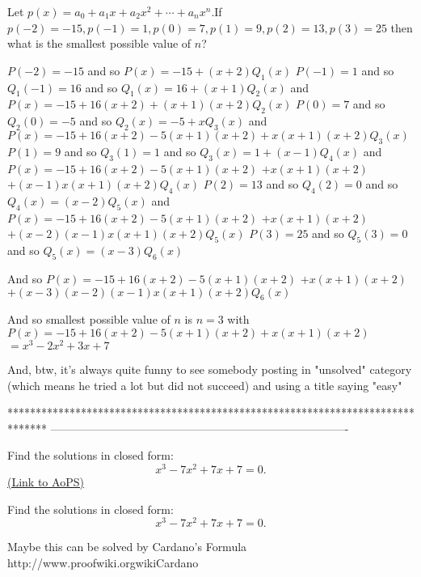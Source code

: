 \begin{solution}
	\begin{tcolorbox}Let $p(x)=a_0+a_1x+a_2x^2+ \cdots +a_nx^n$.If $p(-2)=-15,p(-1)=1,p(0)=7,p(1)=9,p(2)=13,p(3)=25$ then what is the smallest possible value of $n$?\end{tcolorbox}
$P(-2)=-15$ and so $P(x)=-15+(x+2)Q_1(x)$
$P(-1)=1$ and so $Q_1(-1)=16$ and so $Q_1(x)=16+(x+1)Q_2(x)$ and $P(x)=-15+16(x+2)+(x+1)(x+2)Q_2(x)$
$P(0)=7$ and so $Q_2(0)=-5$ and so $Q_2(x)=-5+xQ_3(x)$ and $P(x)=-15+16(x+2)-5(x+1)(x+2)+x(x+1)(x+2)Q_3(x)$
$P(1)=9$ and so $Q_3(1)=1$ and so $Q_3(x)=1+(x-1)Q_4(x)$ and $P(x)=-15+16(x+2)-5(x+1)(x+2)$ $+x(x+1)(x+2)$ $+(x-1)x(x+1)(x+2)Q_4(x)$
$P(2)=13$ and so $Q_4(2)=0$ and so $Q_4(x)=(x-2)Q_5(x)$ and $P(x)=-15+16(x+2)-5(x+1)(x+2)$ $+x(x+1)(x+2)$ $+(x-2)(x-1)x(x+1)(x+2)Q_5(x)$
$P(3)=25$ and so $Q_5(3)=0$ and so $Q_5(x)=(x-3)Q_6(x)$

And so $P(x)=-15+16(x+2)-5(x+1)(x+2)$ $+x(x+1)(x+2)$ $+(x-3)(x-2)(x-1)x(x+1)(x+2)Q_6(x)$

And so smallest possible value of $n$ is $\boxed{n=3}$ with $P(x)=-15+16(x+2)-5(x+1)(x+2)+x(x+1)(x+2)$ $=x^3-2x^2+3x+7$

And, btw, it's always quite funny to see somebody posting in "unsolved" category (which means he tried a lot but did not succeed) and using a title saying "easy"  
\end{solution}
*******************************************************************************
-------------------------------------------------------------------------------

\begin{problem}
	Find the solutions in closed form:
\[x^{3}-7x^{2}+7x+7=0. \]
	\flushright \href{https://artofproblemsolving.com/community/c6h444682}{(Link to AoPS)}
\end{problem}



\begin{solution}
	\begin{tcolorbox}Find the solutions in closed form:
\[x^{3}-7x^{2}+7x+7=0. \]\end{tcolorbox}
Maybe this can be solved by Cardano's Formula
http://www.proofwiki.org\/wiki\/Cardano%
\end{solution}



